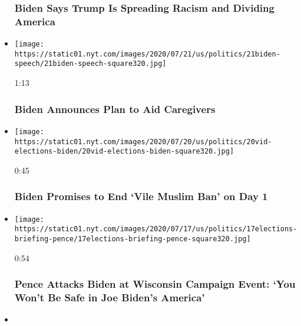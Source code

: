 \begin{itemize}
{  \subsubsection{Biden Says Trump Is Spreading Racism and Dividing
  America}\label{biden-says-trump-is-spreading-racism-and-dividing-america}}
\item
  \href{https://www.nytimes.com/video/us/100000007249436/biden-announces-plan-to-aid-caregivers.html?action=click\&module=video-series-bar\&region=header\&pgtype=Article\&playlistId=video/2020-Elections}{}

  \texttt{[image: https://static01.nyt.com/images/2020/07/21/us/politics/21biden-speech/21biden-speech-square320.jpg]}

  1:13

  \hypertarget{biden-announces-plan-to-aid-caregivers}{%
  \subsubsection{Biden Announces Plan to Aid
  Caregivers}\label{biden-announces-plan-to-aid-caregivers}}
\item
  \href{https://www.nytimes.com/video/us/100000007248132/biden-muslim-voters.html?action=click\&module=video-series-bar\&region=header\&pgtype=Article\&playlistId=video/2020-Elections}{}

  \texttt{[image: https://static01.nyt.com/images/2020/07/20/us/politics/20vid-elections-biden/20vid-elections-biden-square320.jpg]}

  0:45

  \hypertarget{biden-promises-to-end-vile-muslim-ban-on-day-1}{%
  \subsubsection{Biden Promises to End `Vile Muslim Ban' on Day
  1}\label{biden-promises-to-end-vile-muslim-ban-on-day-1}}
\item
  \href{https://www.nytimes.com/video/us/100000007244976/pence-calls-out-biden-wisconsin.html?action=click\&module=video-series-bar\&region=header\&pgtype=Article\&playlistId=video/2020-Elections}{}

  \texttt{[image: https://static01.nyt.com/images/2020/07/17/us/politics/17elections-briefing-pence/17elections-briefing-pence-square320.jpg]}

  0:54

  \hypertarget{pence-attacks-biden-at-wisconsin-campaign-event-you-wont-be-safe-in-joe-bidens-america}{%
  \subsubsection{Pence Attacks Biden at Wisconsin Campaign Event: `You
  Won't Be Safe in Joe Biden's
  America'}\label{pence-attacks-biden-at-wisconsin-campaign-event-you-wont-be-safe-in-joe-bidens-america}}
\item
  \href{https://www.nytimes.com/video/us/politics/100000007239700/jeff-sessions-alabama.html?action=click\&module=video-series-bar\&region=header\&pgtype=Article\&playlistId=video/2020-Elections}{}


\end{itemize}
